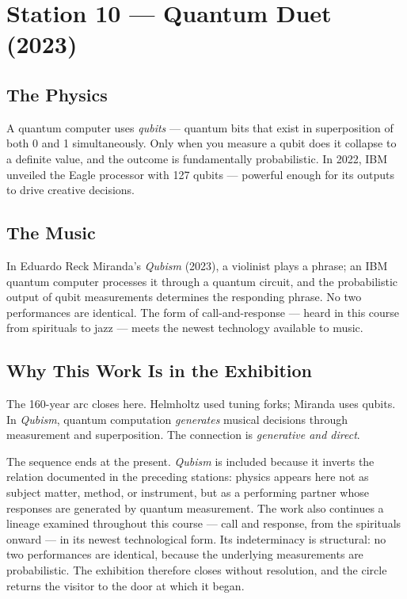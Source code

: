 \documentclass[11pt]{article}
\begin{document}
\section{Station 10 --- Quantum Duet (2023)}

\subsection{The Physics}
A quantum computer uses \emph{qubits} --- quantum bits that exist in superposition of both 0
and 1 simultaneously. Only when you measure a qubit does it collapse to a definite value, and
the outcome is fundamentally probabilistic. In 2022, IBM unveiled the Eagle processor with
127 qubits --- powerful enough for its outputs to drive creative decisions.

\subsection{The Music}
In Eduardo Reck Miranda's \emph{Qubism} (2023), a violinist plays a phrase; an IBM quantum
computer processes it through a quantum circuit, and the probabilistic output of qubit
measurements determines the responding phrase. No two performances are identical. The form of
call-and-response --- heard in this course from spirituals to jazz --- meets the newest
technology available to music.

\subsection{Why This Work Is in the Exhibition}
The 160-year arc closes here. Helmholtz used tuning forks; Miranda uses qubits. In
\emph{Qubism}, quantum computation \emph{generates} musical decisions through measurement and
superposition. The connection is \emph{generative and direct}.

The sequence ends at the present. \emph{Qubism} is included because it inverts the relation
documented in the preceding stations: physics appears here not as subject matter, method, or
instrument, but as a performing partner whose responses are generated by quantum measurement.
The work also continues a lineage examined throughout this course --- call and response, from
the spirituals onward --- in its newest technological form. Its indeterminacy is structural:
no two performances are identical, because the underlying measurements are probabilistic. The
exhibition therefore closes without resolution, and the circle returns the visitor to the
door at which it began.
\end{document}
